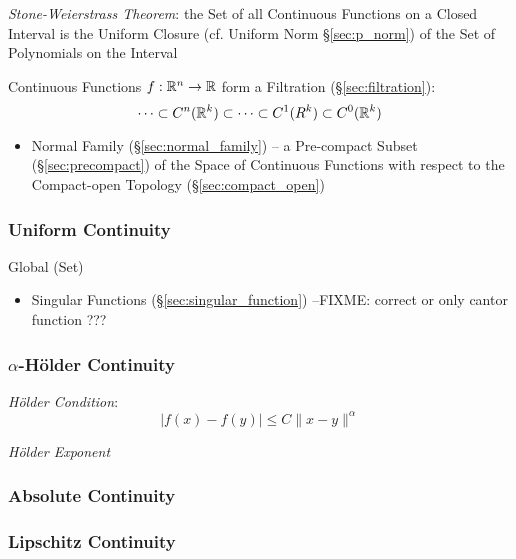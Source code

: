 \emph{Stone-Weierstrass Theorem}: the Set of all Continuous Functions on a
Closed Interval is the Uniform Closure (cf. Uniform Norm \S\ref{sec:p_norm}) of
the Set of Polynomials on the Interval

Continuous Functions $f : \mathbb{R}^n \rightarrow \mathbb{R}$ form a Filtration
(\S\ref{sec:filtration}):
\[
  \cdots \subset C^n(\mathbb{R}^k) \subset \cdots \subset C^1(R^k) \subset
    C^0(\mathbb{R}^k)
\]

\begin{itemize}
  \item Normal Family (\S\ref{sec:normal_family}) -- a Pre-compact Subset
    (\S\ref{sec:precompact}) of the Space of Continuous Functions with respect
    to the Compact-open Topology (\S\ref{sec:compact_open})
\end{itemize}



\subsubsection{Uniform Continuity}\label{sec:uniform_continuity}

Global (Set)

\begin{itemize}
  \item Singular Functions (\S\ref{sec:singular_function})
    --FIXME: correct or only cantor function ???
\end{itemize}



\subsubsection{$\alpha$-H\"older Continuity}\label{sec:holder_continuity}

\emph{H\"older Condition}:
\[
  |f(x) - f(y)| \leq C \|x - y\|^\alpha
\]

\emph{H\"older Exponent}



\subsubsection{Absolute Continuity}\label{sec:absolute_continuity}

\subsubsection{Lipschitz Continuity}\label{sec:lipschitz_continuity}

